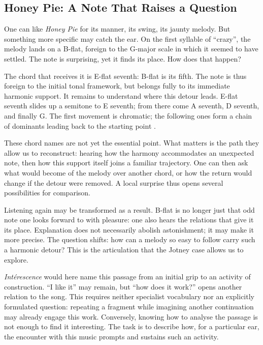 \documentclass[11pt,a4paper]{article}
\begin{document}
\subsection{Honey Pie: A Note That Raises a Question}
\label{sec:honey-pie}

One can like \emph{Honey Pie} for its manner, its swing, its jaunty melody.
But something more specific may catch the ear. On the first syllable of
\enquote{crazy}, the melody lands on a B-flat, foreign to the G-major scale in which
it seemed to have settled. The note is surprising, yet it finds its place.
How does that happen?

The chord that receives it is E-flat seventh: B-flat is its fifth.
The note is thus foreign to the initial tonal framework, but belongs fully
to its immediate harmonic support. It remains to understand where this detour
leads. E-flat seventh slides up a semitone to E seventh; from there come
A seventh, D seventh, and finally G. The first movement is chromatic;
the following ones form a chain of dominants leading back to the starting
point \parencite{blick2013honeypie,pollack1998honeypie}.

These chord names are not yet the essential point. What matters is the path
they allow us to reconstruct: hearing how the harmony accommodates an unexpected
note, then how this support itself joins a familiar trajectory. One can then
ask what would become of the melody over another chord, or how the return would
change if the detour were removed. A local surprise thus opens several
possibilities for comparison.

Listening again may be transformed as a result. B-flat is no longer just that
odd note one looks forward to with pleasure: one also hears the relations that
give it its place. Explanation does not necessarily abolish astonishment;
it may make it more precise. The question shifts: how can a melody so easy
to follow carry such a harmonic detour? This is the articulation that the
Jotney case allows us to explore.

\emph{Intérescence} would here name this passage from an initial grip to an
activity of construction. \enquote{I like it} may remain, but \enquote{how does it work?}
opens another relation to the song. This requires neither specialist vocabulary
nor an explicitly formulated question: repeating a fragment while imagining
another continuation may already engage this work. Conversely, knowing how to
analyse the passage is not enough to find it interesting. The task is to
describe how, for a particular ear, the encounter with this music prompts
and sustains such an activity.
\end{document}
